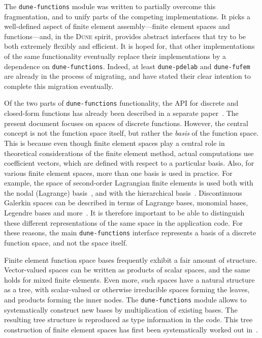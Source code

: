 \documentclass[a4paper,10pt,headings=normal,bibliography=totoc]{scrartcl}
\newcommand{\dune}{\textsc{Dune}\xspace}
\newcommand{\dunemodule}[1]{\texttt{#1}}
\begin{document}
The \dunemodule{dune-functions}  module was written to partially overcome this fragmentation,
and to unify parts of the competing implementations.
It picks a well-defined aspect of finite element assembly---finite element spaces and functions---and,
in the \dune spirit, provides abstract interfaces that try to be both extremely flexibly
and efficient.  It is hoped for, that other implementations of the same functionality
eventually replace their implementations by a dependence on \dunemodule{dune-functions}.
Indeed, at least \dunemodule{dune-pdelab} and \dunemodule{dune-fufem} are already in the process
of migrating, and have stated their clear intention to complete this migration eventually.

Of the two parts of \dunemodule{dune-functions} functionality, the API for discrete and
closed-form functions has already been described in a separate paper~\cite{engwer_graeser_muething_sander:2015}.
The present document focuses on spaces of discrete functions.  However,
the central concept is not the function space itself, but rather the {\em basis} of the function space.
This is because even though finite element spaces play a central role in theoretical considerations of
the finite element method,
actual computations use coefficient vectors, which are defined with respect to a particular basis.  Also,
for various finite element spaces, more than one basis is used in practice.  For example,
the space of second-order Lagrangian finite elements is used both with the nodal (Lagrange) basis~\cite{braess:2013},
and with the
hierarchical basis~\cite{bank:1996}.  Discontinuous Galerkin spaces can be described in terms of Lagrange bases,
monomial bases, Legendre bases and more~\cite{hesthaven_warburton:2008}.
It is therefore important to be able to distinguish these different
representations of the same space in the application code.
For these reasons, the main \dunemodule{dune-functions} interface represents a basis of a
discrete function space, and not the space itself.

Finite element function space bases frequently exhibit a fair amount of structure.  Vector-valued spaces can be
written as products of scalar spaces, and the same holds for mixed finite elements.  Even more, such spaces
have a natural structure as a tree, with scalar-valued or otherwise irreducible spaces forming the leaves, and
products forming the inner nodes. The \dunemodule{dune-functions} module
allows to systematically construct new bases by multiplication of existing bases.
The resulting tree structure is reproduced as type information in the code.
This tree construction of finite element spaces has first been systematically worked out in~\cite{muething:2015}.
\end{document}
